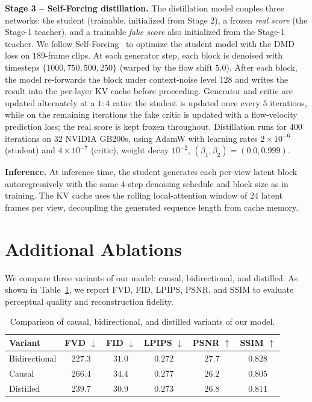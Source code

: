 \documentclass{llmxive}
\providecommand{\arraystretch}{1.12}
\begin{document}
\noindent\textbf{Stage 3 -- Self-Forcing distillation.}
The distillation model couples three networks: the student (trainable, initialized from Stage 2), a frozen \emph{real score} (the Stage-1 teacher), and a trainable \emph{fake score} also initialized from the Stage-1 teacher. We follow Self-Forcing~\cite{huang2025self} to optimize the student model with the DMD~\cite{yin2024one} loss on $189$-frame clips. At each generator step, each block is denoised with timesteps $\{1000, 750, 500, 250\}$ (warped by the flow shift $5.0$). After each block, the model re-forwards the block under context-noise level $128$ and writes the result into the per-layer KV cache before proceeding. Generator and critic are updated alternately at a $1{:}4$ ratio: the student is updated once every $5$ iterations, while on the remaining iterations the fake critic is updated with a flow-velocity prediction loss; the real score is kept frozen throughout. Distillation runs for $400$ iterations on $32$ NVIDIA GB200s, using AdamW with learning rates $2{\times}10^{-6}$ (student) and $4{\times}10^{-7}$ (critic), weight decay $10^{-2}$, $(\beta_1, \beta_2) = (0.0, 0.999)$.

\noindent\textbf{Inference.}
At inference time, the student generates each per-view latent block autoregressively with the same $4$-step denoising schedule and block size as in training. The KV cache uses the rolling local-attention window of $24$ latent frames per view, decoupling the generated sequence length from cache memory.


\section{Additional Ablations}
\label{app:additional-ablations}

We compare three variants of our model: causal, bidirectional, and distilled.
As shown in Table~\ref{tab:model-variant-ablation}, we report FVD, FID, LPIPS, PSNR, and SSIM to evaluate perceptual quality and reconstruction fidelity.

\begin{table}[t]
  \centering
  \footnotesize
  \vspace{4pt}
  \setlength{\tabcolsep}{4pt}
  \renewcommand{\arraystretch}{1.12}
  \begin{tabular}{@{}lccccc@{}}
    \toprule
    \textbf{Variant}
      & FVD $\downarrow$
      & FID $\downarrow$
      & LPIPS $\downarrow$
      & PSNR $\uparrow$
      & SSIM $\uparrow$ \\
    \midrule
    Bidirectional
      & $227.3$ & $31.0$ & $0.272$ & $27.7$ & $0.828$ \\
    Causal
      & $266.4$ & $34.4$ & $0.277$ & $26.2$ & $0.805$ \\
    Distilled
      & $239.7$ & $30.9$ & $0.273$ & $26.8$ & $0.811$ \\
    \bottomrule
  \end{tabular}
\caption{Comparison of causal, bidirectional, and distilled variants of our model.}
\label{tab:model-variant-ablation}
\end{table}
\end{document}
